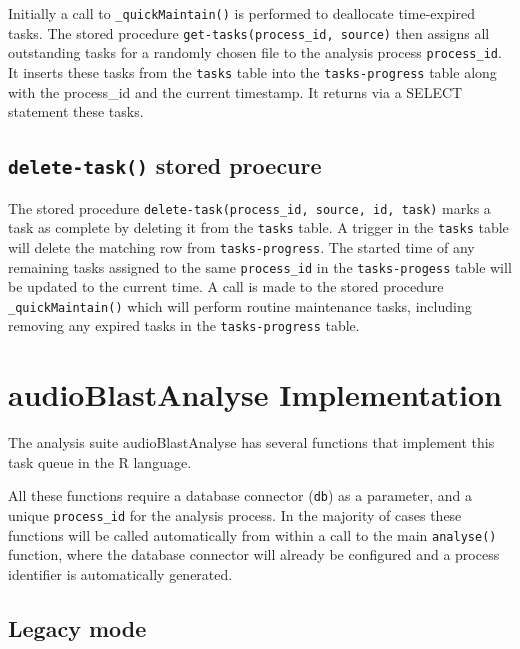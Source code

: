 \documentclass[
]{book}
\begin{document}
Initially a call to \texttt{\_quickMaintain()} is performed to deallocate time-expired tasks. The stored procedure \texttt{get-tasks(process\_id,\ source)} then assigns all outstanding tasks for a randomly chosen file to the analysis process \texttt{process\_id}. It inserts these tasks from the \texttt{tasks} table into the \texttt{tasks-progress} table along with the process\_id and the current timestamp. It returns via a SELECT statement these tasks.

\hypertarget{delete-task-stored-proecure}{%
\subsection{\texorpdfstring{\texttt{delete-task()} stored proecure}{delete-task() stored proecure}}\label{delete-task-stored-proecure}}

The stored procedure \texttt{delete-task(process\_id,\ source,\ id,\ task)} marks a task as complete by deleting it from the \texttt{tasks} table. A trigger in the \texttt{tasks} table will delete the matching row from \texttt{tasks-progress}. The started time of any remaining tasks assigned to the same \texttt{process\_id} in the \texttt{tasks-progess} table will be updated to the current time. A call is made to the stored procedure \texttt{\_quickMaintain()} which will perform routine maintenance tasks, including removing any expired tasks in the \texttt{tasks-progress} table.

\hypertarget{audioblastanalyse-implementation}{%
\section{audioBlastAnalyse Implementation}\label{audioblastanalyse-implementation}}

The analysis suite audioBlastAnalyse has several functions that implement this task queue in the R language.

All these functions require a database connector (\texttt{db}) as a parameter, and a unique \texttt{process\_id} for the analysis process. In the majority of cases these functions will be called automatically from within a call to the main \texttt{analyse()} function, where the database connector will already be configured and a process identifier is automatically generated.

\hypertarget{legacy-mode}{%
\subsection{Legacy mode}\label{legacy-mode}}
\end{document}
